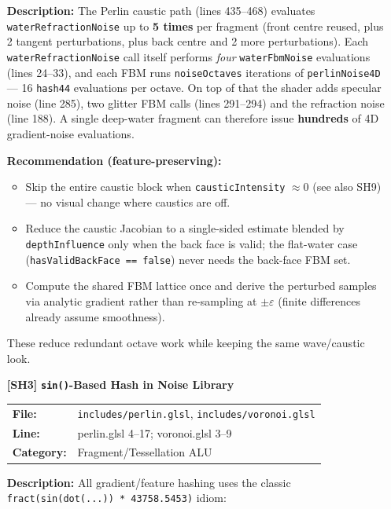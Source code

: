 \documentclass[a4paper,12pt]{article}
\newcommand{\severitybox}[2]{%
  \colorbox{#1}{\makebox[2.5cm][c]{\textcolor{white}{\textbf{#2}}}}%
}
\begin{document}
\begin{enumerate}[leftmargin=*]
  \textbf{Description:}
  The Perlin caustic path (lines 435--468) evaluates
  \texttt{waterRefractionNoise} up to \textbf{5 times} per fragment (front
  centre reused, plus 2 tangent perturbations, plus back centre and 2 more
  perturbations). Each \texttt{waterRefractionNoise} call itself performs
  \emph{four} \texttt{waterFbmNoise} evaluations (lines 24--33), and each FBM
  runs \texttt{noiseOctaves} iterations of \texttt{perlinNoise4D} — 16
  \texttt{hash44} evaluations per octave. On top of that the shader adds
  specular noise (line 285), two glitter FBM calls (lines 291--294) and the
  refraction noise (line 188). A single deep-water fragment can therefore issue
  \textbf{hundreds} of 4D gradient-noise evaluations.

  \textbf{Recommendation (feature-preserving):}
  \begin{itemize}[noitemsep]
    \item Skip the entire caustic block when \texttt{causticIntensity} $\approx 0$
          (see also SH9) — no visual change where caustics are off.
    \item Reduce the caustic Jacobian to a single-sided estimate blended by
          \texttt{depthInfluence} only when the back face is valid; the flat-water
          case (\texttt{hasValidBackFace == false}) never needs the back-face
          FBM set.
    \item Compute the shared FBM lattice once and derive the perturbed samples
          via analytic gradient rather than re-sampling at $\pm\varepsilon$
          (finite differences already assume smoothness).
  \end{itemize}
  These reduce redundant octave work while keeping the same wave/caustic look.

\item[\textbf{[SH3]}] \textbf{\texttt{sin()}-Based Hash in Noise Library}
  \hfill \severitybox{highcolor}{HIGH}

  \begin{tabular}{ll}
    \textbf{File:} & \texttt{includes/perlin.glsl}, \texttt{includes/voronoi.glsl} \\
    \textbf{Line:} & perlin.glsl 4--17; voronoi.glsl 3--9 \\
    \textbf{Category:} & Fragment/Tessellation ALU \\
  \end{tabular}

  \textbf{Description:}
  All gradient/feature hashing uses the classic
  \texttt{fract(sin(dot(...)) * 43758.5453)} idiom:


\end{enumerate}
\end{document}
